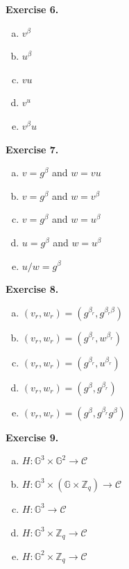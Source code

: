 \documentclass[../lecture-notes.tex]{subfiles}
\begin{document}
    \newpage
    \textbf{Exercise 6.}
    \vspace{-3mm}

    \begin{multicols}{3}
        \setlength{\columnsep}{10pt}
        \begin{enumerate}[a)]
            \item $v^{\beta}$
            \item $u^{\beta}$
            \item $vu$
            \item $v^u$
            \item $v^{\beta}u$
        \end{enumerate}
    \end{multicols}
    \vspace{-3mm}
    
    \textbf{Exercise 7.}
    \begin{enumerate}[a)]
        \item $v = g^{\beta}$ and $w = vu$
        \item $v = g^{\beta}$ and $w = v^{\beta}$
        \item $v = g^{\beta}$ and $w = u^{\beta}$
        \item $u = g^{\beta}$ and $w = u^{\beta}$
        \item $u/w = g^{\beta}$
    \end{enumerate}
    
    \vspace{5pt} %
    
    \textbf{Exercise 8.}
    \begin{enumerate}[a)]
        \item $(v_r,w_r) = (g^{\beta_r},g^{\beta_r\beta})$
        \item $(v_r,w_r) = (g^{\beta_r},w^{\beta_r})$
        \item $(v_r,w_r) = (g^{\beta_r},u^{\beta_r})$
        \item $(v_r,w_r) = (g^{\beta},g^{\beta_r})$
        \item $(v_r,w_r) = (g^{\beta},g^{\beta_r}g^{\beta})$
    \end{enumerate}
    
    \vspace{5pt} %
    
    \textbf{Exercise 9.}
    \begin{enumerate}[a)]
        \item $H: \mathbb{G}^3 \times \mathbb{G}^2 \to \mathcal{C}$
        \item $H: \mathbb{G}^3 \times (\mathbb{G} \times \mathbb{Z}_q) \to \mathcal{C}$
        \item $H: \mathbb{G}^3 \to \mathcal{C}$
        \item $H: \mathbb{G}^3 \times \mathbb{Z}_q \to \mathcal{C}$
        \item $H: \mathbb{G}^2 \times \mathbb{Z}_q \to \mathcal{C}$
    \end{enumerate}
    
\end{document}
